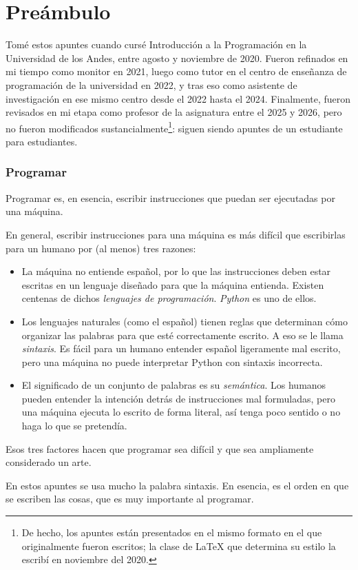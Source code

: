 \part*{Preámbulo}

Tomé estos apuntes cuando cursé Introducción a la Programación en la Universidad de los Andes, entre agosto y noviembre de 2020. Fueron refinados en mi tiempo como monitor en 2021, luego como tutor en el centro de enseñanza de programación de la universidad en 2022, y tras eso como asistente de investigación en ese mismo centro desde el 2022 hasta el 2024. Finalmente, fueron revisados en mi etapa como profesor de la asignatura entre el 2025 y 2026, pero no fueron modificados sustancialmente\footnote{De hecho, los apuntes están presentados en el mismo formato en el que originalmente fueron escritos; la clase de \LaTeX{} que determina su estilo la escribí en noviembre del 2020.}: siguen siendo apuntes de un estudiante para estudiantes. 

\section{Programar}

Programar es, en esencia, escribir instrucciones que puedan ser ejecutadas por una máquina.

En general, escribir instrucciones para una máquina es más difícil que escribirlas para un humano por (al menos) tres razones:
\begin{itemize}
  \item La máquina no entiende español, por lo que las instrucciones deben estar escritas en un lenguaje diseñado para que la máquina entienda. Existen centenas de dichos \emph{lenguajes de programación}. \emph{Python} es uno de ellos.
  \item Los lenguajes naturales (como el español) tienen reglas que determinan cómo organizar las palabras para que esté correctamente escrito. A eso se le llama \emph{sintaxis}. Es fácil para un humano entender español ligeramente mal escrito, pero una máquina no puede interpretar Python con sintaxis incorrecta.
  \item El significado de un conjunto de palabras es su \emph{semántica}. Los humanos pueden entender la intención detrás de instrucciones mal formuladas, pero una máquina ejecuta lo escrito de forma literal, así tenga poco sentido o no haga lo que se pretendía.
\end{itemize}

Esos tres factores hacen que programar sea difícil y que sea ampliamente considerado un arte.

\begin{tip}
  En estos apuntes se usa mucho la palabra sintaxis. En esencia, es el orden en que se escriben las cosas, que es muy importante al programar.
\end{tip}
